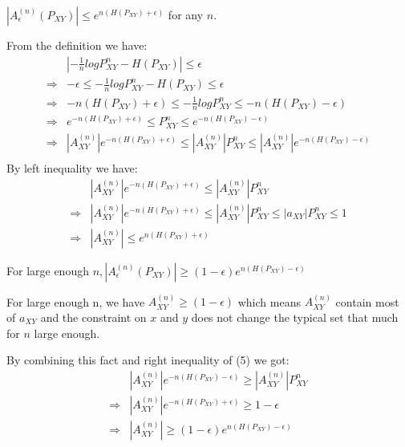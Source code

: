 \documentclass[
  course = {{EE623 Information Theory}},
  quartile = {{Fall 2020}},
  assignment = 7,
  name = {{Mohammad Mahdi Rahimi}},
  studentnumber = {{20208244}},
  email = {{mahi@kaist.ac.kr}},
  firstexercise = 1
]{aga-homework}
\begin{document}
\newpage

\subexercise $\left| A^{(n)}_\epsilon(P_{XY})\right| \le e^{n(H(P_{XY})+\epsilon)}$ for any $n$.

From the definition we have:
\begin{equation} \label{eq5}
\begin{split}
&\left|-\frac{1}{n}logP^n_{XY} - H(P_{XY})\right| \le \epsilon\\
\Rightarrow & -\epsilon \le -\frac{1}{n}logP^n_{XY} - H(P_{XY}) \le \epsilon\\
\Rightarrow & -n(H(P_{XY}) + \epsilon) \le -\frac{1}{n}logP^n_{XY} \le -n(H(P_{XY}) - \epsilon)\\
\Rightarrow & e^{-n(H(P_{XY}) + \epsilon)} \le P^n_{XY} \le e^{-n(H(P_{XY}) - \epsilon)}\\
\Rightarrow & |A^{(n)}_{XY}|e^{-n(H(P_{XY}) + \epsilon)} \le |A^{(n)}_{XY}|P^n_{XY} \le |A^{(n)}_{XY}|e^{-n(H(P_{XY}) - \epsilon)}\\
\end{split}
\end{equation}
By left inequality we have:
\begin{equation} \label{eq6}
\begin{split}
&|A^{(n)}_{XY}|e^{-n(H(P_{XY}) + \epsilon)} \le |A^{(n)}_{XY}|P^n_{XY}\\
\Rightarrow & |A^{(n)}_{XY}|e^{-n(H(P_{XY}) + \epsilon)} \le |A^{(n)}_{XY}|P^n_{XY} \le |a_{XY}|P^n_{XY} \le 1 \\
\Rightarrow & |A^{(n)}_{XY}| \le e^{n(H(P_{XY}) + \epsilon)}
\end{split}
\end{equation}


\subexercise For large enough $n, \left| A^{(n)}_\epsilon(P_{XY})\right| \ge (1-\epsilon)e^{n(H(P_{XY})-\epsilon)}$

For large enough n, we have $A^{(n)}_{XY} \ge (1 - \epsilon)$ which means $A^{(n)}_{XY}$ contain most of $a_{XY}$ and the constraint on $x$ and $y$ does not change the typical set that much for $n$ large enough.

By combining this fact and right inequality of (5) we got:
\begin{equation} \label{eq7}
\begin{split}
&|A^{(n)}_{XY}|e^{-n(H(P_{XY}) - \epsilon)} \ge |A^{(n)}_{XY}|P^n_{XY}\\
\Rightarrow & |A^{(n)}_{XY}|e^{-n(H(P_{XY}) + \epsilon)} \ge 1 - \epsilon\\
\Rightarrow & |A^{(n)}_{XY}| \ge (1-\epsilon)e^{n(H(P_{XY}) - \epsilon)}
\end{split}
\end{equation}
\end{document}
